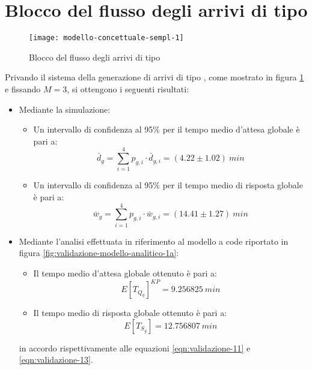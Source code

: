 \section{Blocco del flusso degli arrivi di tipo \sr{}}\label{sec:validazione-blocco-sr}
\begin{figure}[ht]
\centering
\texttt{[image: modello-concettuale-sempl-1]}
\caption{Blocco del flusso degli arrivi di tipo \sr{}}
\label{fig:validazione-semplificazione-1}
\end{figure}
Privando il sistema della generazione di arrivi di tipo \sr{}, come mostrato in figura \ref{fig:validazione-semplificazione-1} e fissando $M=3$, si ottengono i seguenti risultati:
\begin{itemize}
\item Mediante la simulazione:
\begin{itemize}
\item Un intervallo di confidenza al 95\% per il tempo medio d'attesa globale è pari a:
\begin{equation} 
\bar{d}_g = \sum_{i = 1}^4 p_{g,i}\cdot \bar{d}_{g,i} = (4.22 \pm 1.02)\ min
\end{equation}
\item Un intervallo di confidenza al 95\% per il tempo medio di risposta globale è pari a:
\begin{equation}
\bar{w}_g = \sum_{i = 1}^4 p_{g,i}\cdot \bar{w}_{g,i} = (14.41 \pm 1.27)\ min
\end{equation}
\end{itemize}

\item Mediante l'analisi effettuata in riferimento al modello a code riportato in figura \ref{fig:validazione-modello-analitico-1a}:
\begin{itemize}
\item Il tempo medio d'attesa globale ottenuto è pari a:
\begin{equation}
E[T_{Q_g}]^{KP} = 9.256825\ min 
\end{equation}
\item Il tempo medio di risposta globale ottenuto è pari a:
\begin{equation}
E[T_{S_g}] = 12.756807\ min 
\end{equation}
\end{itemize}
in accordo rispettivamente alle equazioni \ref{eqn:validazione-11} e \ref{eqn:validazione-13}.
\end{itemize}

